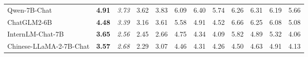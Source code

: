 \begin{table}[t]
{\begin{tabular}{@{}l|c|ccc|ccccccc@{}}
Qwen-7B-Chat                    & \textbf{4.91}                     & \multicolumn{1}{c|}{\textit{3.73}}                                   & 3.62                                            & 3.83                                            & \multicolumn{1}{c|}{6.09}                                            & 6.40                                            & 5.74                                            & 6.26                                            & 6.31                                            & 6.19                                            & 5.66                                            \\
ChatGLM2-6B                     & \textbf{4.48}                     & \multicolumn{1}{c|}{\textit{3.39}}                                   & 3.16                                            & 3.61                                            & \multicolumn{1}{c|}{5.58}                                            & 4.91                                            & 4.52                                            & 6.66                                            & 6.25                                            & 6.08                                            & 5.08                                            \\
InternLM-Chat-7B               & \textbf{3.65}                     & \multicolumn{1}{c|}{\textit{2.56}}                                   & 2.45                                            & 2.66                                            & \multicolumn{1}{c|}{4.75}                                            & 4.34                                            & 4.09                                            & 5.82                                            & 4.89                                            & 5.32                                            & 4.06                                            \\
Chinese-LLaMA-2-7B-Chat         & \textbf{3.57}                     & \multicolumn{1}{c|}{\textit{2.68}}                                   & 2.29                                            & 3.07                                            & \multicolumn{1}{c|}{4.46}                                            & 4.31                                            & 4.26                                            & 4.50                                            & 4.63                                            & 4.91                                            & 4.13                                            \\

\end{tabular}}
\end{table}
